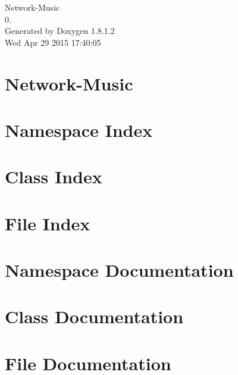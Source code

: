 \documentclass{book}
\begin{document}
\hypersetup{pageanchor=false,citecolor=blue}
\begin{titlepage}
\vspace*{7cm}
\begin{center}
{\Large Network-\/\-Music \\[1ex]\large 0. }\\
\vspace*{1cm}
{\large Generated by Doxygen 1.8.1.2}\\
\vspace*{0.5cm}
{\small Wed Apr 29 2015 17:40:05}\\
\end{center}
\end{titlepage}
\clearemptydoublepage
{}
\tableofcontents
\clearemptydoublepage
{}
\hypersetup{pageanchor=true,citecolor=blue}
\chapter{Network-\/\-Music}
\label{md_README}
\hypertarget{md_README}{}

\chapter{Namespace Index}

\chapter{Class Index}

\chapter{File Index}

\chapter{Namespace Documentation}

\chapter{Class Documentation}











\chapter{File Documentation}
















\printindex
\end{document}
